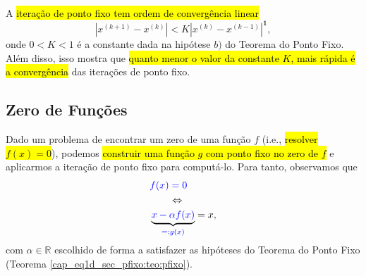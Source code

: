 \begin{obs}
  A \hl{iteração de ponto fixo tem ordem de convergência linear}
  \begin{equation}
    |x^{(k+1)} - x^{(k)}| < K|x^{(k)} - x^{(k-1)}|^{\pmb{1}},
  \end{equation}
onde $0 < K < 1$ é a constante dada na hipótese $b)$ do Teorema do Ponto Fixo. Além disso, isso mostra que \hl{quanto menor o valor da constante $K$, mais rápida é a convergência} das iterações de ponto fixo.
\end{obs}


\subsection{Zero de Funções}

Dado um problema de encontrar um zero de uma função $f$ (i.e., \hl{resolver $f(x)=0$}), podemos \hl{construir uma função $g$ com ponto fixo no zero de $f$} e aplicarmos a iteração de ponto fixo para computá-lo. Para tanto, observamos que
\begin{align}
  &{\color{blue}f(x) = 0} \\
  &\qquad\Leftrightarrow \\
  &\underbrace{{\color{blue}x - \alpha f(x)}}_{\color{blue}=: g(x)} = x,
\end{align}
com $\alpha\in\mathbb{R}$ escolhido de forma a satisfazer as hipóteses do Teorema do Ponto Fixo (Teorema \ref{cap_eq1d_sec_pfixo:teo:pfixo}).


